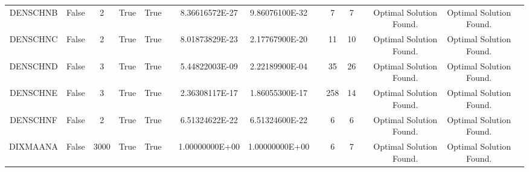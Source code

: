 \begin{longtable}{ccccccccccccccc}
	\cellcolor{default2} DENSCHNB& \cellcolor{default2} False& \cellcolor{default2} 2& \cellcolor{default2} True& \cellcolor{default2} True& \cellcolor{header} & \cellcolor{ok} 8.36616572E-27& \cellcolor{best} 9.86076100E-32& \cellcolor{header} & \cellcolor{best} 7& \cellcolor{best} 7& \cellcolor{header} & \cellcolor{default2} Optimal Solution Found.& \cellcolor{default2} Optimal Solution Found.& \cellcolor{header} \\
	\cellcolor{default1} DENSCHNC& \cellcolor{default1} False& \cellcolor{default1} 2& \cellcolor{default1} True& \cellcolor{default1} True& \cellcolor{header} & \cellcolor{best} 8.01873829E-23& \cellcolor{ok} 2.17767900E-20& \cellcolor{header} & \cellcolor{ok} 11& \cellcolor{best} 10& \cellcolor{header} & \cellcolor{default1} Optimal Solution Found.& \cellcolor{default1} Optimal Solution Found.& \cellcolor{header} \\
	\cellcolor{default2} DENSCHND& \cellcolor{default2} False& \cellcolor{default2} 3& \cellcolor{default2} True& \cellcolor{default2} True& \cellcolor{header} & \cellcolor{best} 5.44822003E-09& \cellcolor{poor} 2.22189900E-04& \cellcolor{header} & \cellcolor{ok} 35& \cellcolor{best} 26& \cellcolor{header} & \cellcolor{default2} Optimal Solution Found.& \cellcolor{default2} Optimal Solution Found.& \cellcolor{header} \\
	\cellcolor{default1} DENSCHNE& \cellcolor{default1} False& \cellcolor{default1} 3& \cellcolor{default1} True& \cellcolor{default1} True& \cellcolor{header} & \cellcolor{ok} 2.36308117E-17& \cellcolor{best} 1.86055300E-17& \cellcolor{header} & \cellcolor{poor} 258& \cellcolor{best} 14& \cellcolor{header} & \cellcolor{default1} Optimal Solution Found.& \cellcolor{default1} Optimal Solution Found.& \cellcolor{header} \\
	\cellcolor{default2} DENSCHNF& \cellcolor{default2} False& \cellcolor{default2} 2& \cellcolor{default2} True& \cellcolor{default2} True& \cellcolor{header} & \cellcolor{ok} 6.51324622E-22& \cellcolor{best} 6.51324600E-22& \cellcolor{header} & \cellcolor{best} 6& \cellcolor{best} 6& \cellcolor{header} & \cellcolor{default2} Optimal Solution Found.& \cellcolor{default2} Optimal Solution Found.& \cellcolor{header} \\
	\cellcolor{default1} DIXMAANA& \cellcolor{default1} False& \cellcolor{default1} 3000& \cellcolor{default1} True& \cellcolor{default1} True& \cellcolor{header} & \cellcolor{best} 1.00000000E+00& \cellcolor{best} 1.00000000E+00& \cellcolor{header} & \cellcolor{best} 6& \cellcolor{ok} 7& \cellcolor{header} & \cellcolor{default1} Optimal Solution Found.& \cellcolor{default1} Optimal Solution Found.& \cellcolor{header} \\

\end{longtable}
